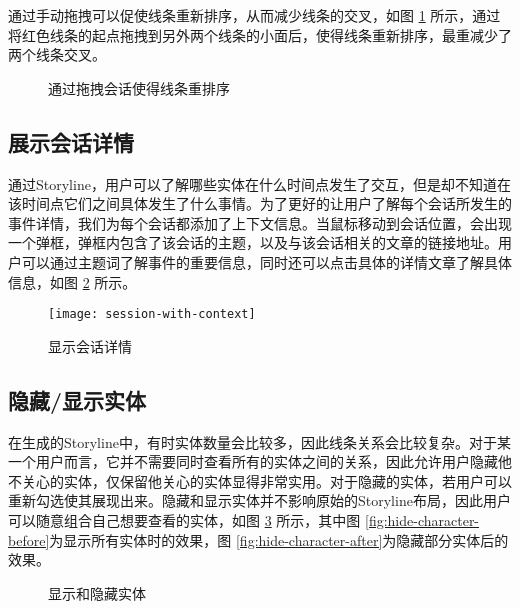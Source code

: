 通过手动拖拽可以促使线条重新排序，从而减少线条的交叉，如图 \ref{fig:drag-to-reorder} 所示，通过将红色线条的起点拖拽到另外两个线条的小面后，使得线条重新排序，最重减少了两个线条交叉。
\begin{figure}[htb]
    \centering
    \caption{通过拖拽会话使得线条重排序}
    \label{fig:drag-to-reorder}
\end{figure}

\subsection{展示会话详情}
通过Storyline，用户可以了解哪些实体在什么时间点发生了交互，但是却不知道在该时间点它们之间具体发生了什么事情。为了更好的让用户了解每个会话所发生的事件详情，我们为每个会话都添加了上下文信息。当鼠标移动到会话位置，会出现一个弹框，弹框内包含了该会话的主题，以及与该会话相关的文章的链接地址。用户可以通过主题词了解事件的重要信息，同时还可以点击具体的详情文章了解具体信息，如图 \ref{fig:session-with-context} 所示。
\begin{figure}[htb]
    \centering
        \texttt{[image: session-with-context]}
    \caption{显示会话详情}
    \label{fig:session-with-context}
\end{figure}

\subsection{隐藏/显示实体}
在生成的Storyline中，有时实体数量会比较多，因此线条关系会比较复杂。对于某一个用户而言，它并不需要同时查看所有的实体之间的关系，因此允许用户隐藏他不关心的实体，仅保留他关心的实体显得非常实用。对于隐藏的实体，若用户可以重新勾选使其展现出来。隐藏和显示实体并不影响原始的Storyline布局，因此用户可以随意组合自己想要查看的实体，如图 \ref{fig:hide-character} 所示，其中图 \ref{fig:hide-character-before}为显示所有实体时的效果，图 \ref{fig:hide-character-after}为隐藏部分实体后的效果。
\begin{figure}[htb]
    \centering

    \caption{显示和隐藏实体}
    \label{fig:hide-character}
\end{figure}

